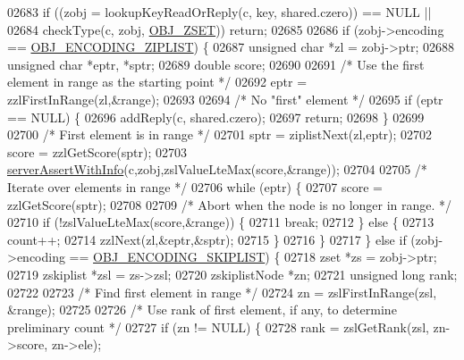 \begin{DoxyCode}
02683     \textcolor{keywordflow}{if} ((zobj = lookupKeyReadOrReply(c, key, shared.czero)) == NULL ||
02684         checkType(c, zobj, \hyperlink{server_8h_a8c356422ddbc03bd77694880a30a1953}{OBJ\_ZSET})) \textcolor{keywordflow}{return};
02685 
02686     \textcolor{keywordflow}{if} (zobj->encoding == \hyperlink{server_8h_aabf064ede983103f1fd0df2086e84eee}{OBJ\_ENCODING\_ZIPLIST}) \{
02687         \textcolor{keywordtype}{unsigned} \textcolor{keywordtype}{char} *zl = zobj->ptr;
02688         \textcolor{keywordtype}{unsigned} \textcolor{keywordtype}{char} *eptr, *sptr;
02689         \textcolor{keywordtype}{double} score;
02690 
02691         \textcolor{comment}{/* Use the first element in range as the starting point */}
02692         eptr = zzlFirstInRange(zl,&range);
02693 
02694         \textcolor{comment}{/* No "first" element */}
02695         \textcolor{keywordflow}{if} (eptr == NULL) \{
02696             addReply(c, shared.czero);
02697             \textcolor{keywordflow}{return};
02698         \}
02699 
02700         \textcolor{comment}{/* First element is in range */}
02701         sptr = ziplistNext(zl,eptr);
02702         score = zzlGetScore(sptr);
02703         \hyperlink{server_8h_a7308f76cbff9a8d3797fe78190b91282}{serverAssertWithInfo}(c,zobj,zslValueLteMax(score,&range));
02704 
02705         \textcolor{comment}{/* Iterate over elements in range */}
02706         \textcolor{keywordflow}{while} (eptr) \{
02707             score = zzlGetScore(sptr);
02708 
02709             \textcolor{comment}{/* Abort when the node is no longer in range. */}
02710             \textcolor{keywordflow}{if} (!zslValueLteMax(score,&range)) \{
02711                 \textcolor{keywordflow}{break};
02712             \} \textcolor{keywordflow}{else} \{
02713                 count++;
02714                 zzlNext(zl,&eptr,&sptr);
02715             \}
02716         \}
02717     \} \textcolor{keywordflow}{else} \textcolor{keywordflow}{if} (zobj->encoding == \hyperlink{server_8h_acfb35db5cb30ed113ed23aeb1a224c4c}{OBJ\_ENCODING\_SKIPLIST}) \{
02718         zset *zs = zobj->ptr;
02719         zskiplist *zsl = zs->zsl;
02720         zskiplistNode *zn;
02721         \textcolor{keywordtype}{unsigned} \textcolor{keywordtype}{long} rank;
02722 
02723         \textcolor{comment}{/* Find first element in range */}
02724         zn = zslFirstInRange(zsl, &range);
02725 
02726         \textcolor{comment}{/* Use rank of first element, if any, to determine preliminary count */}
02727         \textcolor{keywordflow}{if} (zn != NULL) \{
02728             rank = zslGetRank(zsl, zn->score, zn->ele);

\end{DoxyCode}
